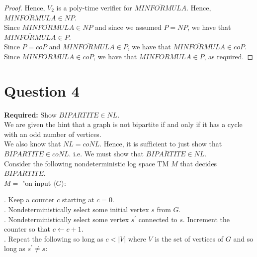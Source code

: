 \documentclass[12pt]{article}
\begin{document}
\begin{proof}
Hence, $V_2$ is a poly-time verifier for $\overline{MINFORMULA}$. Hence, $\overline{MINFORMULA} \in NP$. \\

Since $\overline{MINFORMULA} \in NP$ and since we assumed $P = NP$, we have that $\overline{MINFORMULA} \in P$. \\

Since $P = coP$ and $\overline{MINFORMULA} \in P$, we have that $\overline{MINFORMULA} \in coP$. \\

Since $\overline{MINFORMULA} \in coP$, we have that $MINFORMULA \in P$, as required.

\end{proof}

\newpage

\section*{Question 4}

\textbf{Required:} Show $BIPARTITE \in NL$. \\

We are given the hint that a graph is not bipartite if and only if it has a cycle with an odd number of vertices. \\

We also know that $NL = coNL$. Hence, it is sufficient to just show that $BIPARTITE \in coNL$. i.e. We must show that $\overline{BIPARTITE} \in NL$. \\

Consider the following nondeterministic log space TM $M$ that decides $\overline{BIPARTITE}$. \\

$M = $ "on input $\langle G \rangle$: \\

\setlength\parindent{15pt}

. Keep a counter $c$ starting at $c = 0$. \\
 
. Nondeterministically select some initial vertex $s$ from $G$. \\

. Nondeterministically select some vertex $s^\prime$ connected to $s$. Increment the counter so that $c \leftarrow c + 1$. \\

. Repeat the following so long as $c < |V|$ where $V$ is the set of vertices of $G$ and so long as $s^\prime \neq s$: \\
\end{document}
